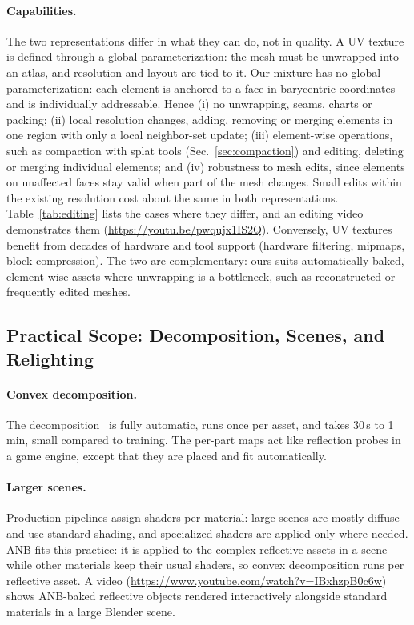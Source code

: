 \begin{addblock}
\paragraph{Capabilities.} The two representations differ in what they can do, not in quality. A UV
texture is defined through a global parameterization: the mesh must be unwrapped into an atlas, and
resolution and layout are tied to it. Our mixture has no global parameterization: each element is
anchored to a face in barycentric coordinates and is individually addressable. Hence (i) no
unwrapping, seams, charts or packing; (ii) local resolution changes, adding, removing or merging
elements in one region with only a local neighbor-set update; (iii) element-wise operations, such as
compaction with splat tools (Sec.~\ref{sec:compaction}) and editing, deleting or merging individual
elements; and (iv) robustness to mesh edits, since elements on unaffected faces stay valid when part
of the mesh changes. Small edits within the existing resolution cost about the same in both
representations. Table~\ref{tab:editing} lists the cases where they differ, and an editing video
demonstrates them (\url{https://youtu.be/pwqujx1IS2Q}). Conversely, UV textures benefit from decades of hardware and tool support
(hardware filtering, mipmaps, block compression). The two are complementary: ours suits
automatically baked, element-wise assets where unwrapping is a bottleneck, such as reconstructed or
frequently edited meshes.

\subsection{Practical Scope: Decomposition, Scenes, and Relighting}
\label{app:scope}
\paragraph{Convex decomposition.} The decomposition~\citep{coacd} is fully automatic, runs once per
asset, and takes 30\,s to 1\,min, small compared to training. The per-part maps act like reflection probes in a game
engine, except that they are placed and fit automatically.
\paragraph{Larger scenes.} Production pipelines assign shaders per material: large scenes are mostly
diffuse and use standard shading, and specialized shaders are applied only where needed. ANB fits
this practice: it is applied to the complex reflective assets in a scene while other materials keep
their usual shaders, so convex decomposition runs per reflective asset. A video
(\url{https://www.youtube.com/watch?v=IBxhzpB0c6w}) shows ANB-baked reflective objects rendered
interactively alongside standard materials in a large Blender scene.

\end{addblock}
